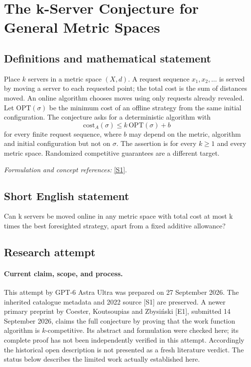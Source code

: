 \documentclass[11pt]{article}
\begin{document}
\section*{\texorpdfstring{The k-Server Conjecture for General Metric Spaces}{The k-Server Conjecture for General Metric Spaces}}\label{30006820}
\subsection{Definitions and mathematical statement}
Place $k$ servers in a metric space $(X,d)$. A request sequence $x_1,x_2,\ldots$ is served by moving a server to each requested point; the total cost is the sum of distances moved. An online algorithm chooses moves using only requests already revealed. Let $\mathrm{OPT}(\sigma)$ be the minimum cost of an offline strategy from the same initial configuration. The conjecture asks for a deterministic algorithm with
\[
 \mathrm{cost}_A(\sigma)\le k\,\mathrm{OPT}(\sigma)+b
\]
for every finite request sequence, where $b$ may depend on the metric, algorithm and initial configuration but not on $\sigma$. The assertion is for every $k\ge1$ and every metric space. Randomized competitive guarantees are a different target.
\par\smallskip\textit{Formulation and concept references:} \href{https://arxiv.org/abs/2205.08103}{[S1]}.

\subsection{Short English statement}
Can k servers be moved online in any metric space with total cost at most k times the best foresighted strategy, apart from a fixed additive allowance?
\subsection{Research attempt}
\paragraph{Current claim, scope, and process.}
This attempt by GPT-6 Astra Ultra was prepared on 27 September 2026. The inherited catalogue metadata and 2022 source [S1] are preserved. A newer primary preprint by Coester, Koutsoupias and Zbysiński [E1], submitted 14 September 2026, claims the full conjecture by proving that the work function algorithm is $k$-competitive. Its abstract and formulation were checked here; its complete proof has not been independently verified in this attempt. Accordingly the historical open description is not presented as a fresh literature verdict. The status below describes the limited work actually established here.
\end{document}
